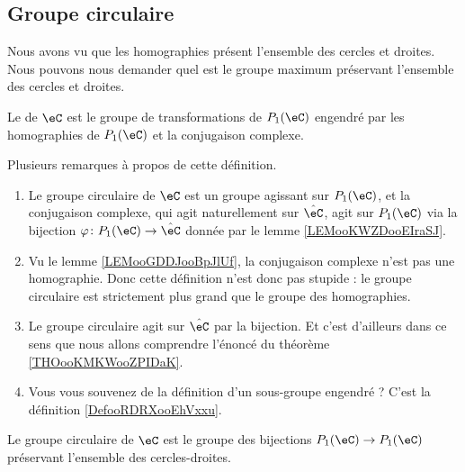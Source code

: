 \subsection{Groupe circulaire}

Nous avons vu que les homographies présent l'ensemble des cercles et droites. Nous pouvons nous demander quel est le groupe maximum préservant l'ensemble des cercles et droites.

\begin{definition}
    Le  de \( \eC\) est le groupe de transformations de \( P_1(\eC)\) engendré par les homographies de \( P_1(\eC)\) et la conjugaison complexe.
\end{definition}

Plusieurs remarques à propos de cette définition.
\begin{enumerate}
    \item
        Le groupe circulaire de \( \eC\) est un groupe agissant sur \( P_1(\eC)\), et la conjugaison complexe, qui agit naturellement sur \( \hat\eC\), agit sur \( P_1(\eC)\) via la bijection \( \varphi\colon P_1(\eC)\to \hat \eC\) donnée par le lemme \ref{LEMooKWZDooEIraSJ}.
    \item
        Vu le lemme \ref{LEMooGDDJooBpJlUf}, la conjugaison complexe n'est pas une homographie. Donc cette définition n'est donc pas stupide : le groupe circulaire est strictement plus grand que le groupe des homographies.
    \item
        Le groupe circulaire agit sur \( \hat\eC\) par la bijection. Et c'est d'ailleurs dans ce sens que nous allons comprendre l'énoncé du théorème \ref{THOooKMKWooZPIDaK}.
    \item
        Vous vous souvenez de la définition d'un sous-groupe engendré ? C'est la définition \ref{DefooRDRXooEhVxxu}.
\end{enumerate}

\begin{theorem}       \label{THOooKMKWooZPIDaK}
    Le groupe circulaire de \( \eC\) est le groupe des bijections \( P_1(\eC)\to P_1(\eC)\) préservant l'ensemble des cercles-droites.
\end{theorem}

